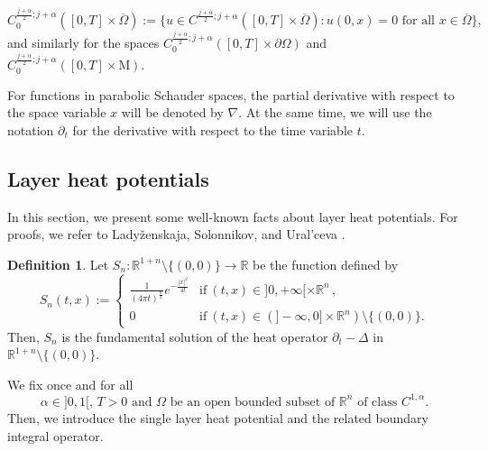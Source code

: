 \documentclass[11pt,reqno,a4paper]{amsart}
\theoremstyle{plain}
\theoremstyle{definition}
\newtheorem{definition}[theorem]{Definition}
\begin{document}
\[
C_0^{\frac{j+\alpha}{2}; j+\alpha}([0, T] \times \overline{\Omega}):= 
\Big\{ u \in C^{\frac{j+\alpha}{2}; j+\alpha}([0, T] \times \overline{\Omega}) \colon u(0,x) = 0 \text{ for all } x \in \overline{\Omega} \Big\},
\]
and similarly for the spaces $C_0^{\frac{j+\alpha}{2}; j+\alpha}([0, T] \times \partial \Omega)$ and $C_0^{\frac{j+\alpha}{2}; j+\alpha}([0, T] \times \mathrm{M})$.

For functions in parabolic Schauder spaces, the partial derivative with respect to the space variable $x$ will be denoted by $\nabla$. At the same time, we will use the notation $\partial_t$ for the derivative with respect to the time variable $t$.

\subsection{Layer heat potentials}
In this section, we present some well-known facts about layer heat potentials. For proofs, we refer to Lady\v{z}enskaja, Solonnikov, and Ural'ceva
\cite{LaSoUr68}. 

\begin{definition}
    Let $S_n : \mathbb{R}^{1+n} \setminus
    \{(0,0)\}\to \mathbb{R}$ be the function defined by
    \[
    S_n(t,x):=
    \left\{
    \begin{array}{ll}
    \frac{1}{(4\pi t)^{\frac{n}{2}} }e^{-\frac{|x|^{2}}{4t}}&{\mathrm{if}}\ (t,x)\in ]0,+\infty[ \times{\mathbb{R}}^{n}\,, 
    \\
    0 &{\mathrm{if}}\ (t,x)\in (]-\infty,0]\times{\mathbb{R}}^{n})\setminus\{(0,0)\}.
    \end{array}
    \right.
    \]
    Then, $S_n$ is the fundamental solution of the heat operator $\partial_t-\Delta$ in $\mathbb{R}^{1+n} \setminus \{(0,0)\}$.
\end{definition}

We fix once and for all 
\[
\alpha \in ]0,1[, \, T>0 \text{ and } \Omega \text{ be an open bounded subset of }\mathbb{R}^n \text{ of class }C^{1,\alpha}.
\] 
Then, we introduce the single layer heat potential and the related boundary integral operator.
\end{document}
